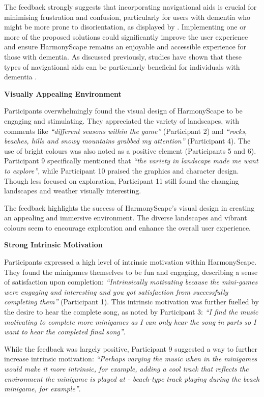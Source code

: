 \documentclass{l4proj}
\begin{document}
The feedback strongly suggests that incorporating navigational aids is crucial for minimising frustration and confusion, particularly for users with dementia who might be more prone to disorientation, as displayed by \cite{lin_effects_2002}. Implementing one or more of the proposed solutions could significantly improve the user experience and ensure HarmonyScape remains an enjoyable and accessible experience for those with dementia. As discussed previously, studies have shown that these types of navigational aids can be particularly beneficial for individuals with dementia \citep{boggio_non-invasive_2011}.
\newline

\textbf{Visually Appealing Environment}

Participants overwhelmingly found the visual design of HarmonyScape to be engaging and stimulating. They appreciated the variety of landscapes, with comments like \emph{“different seasons within the game”} (Participant 2) and \emph{“rocks, beaches, hills and snowy mountains grabbed my attention”} (Participant 4). The use of bright colours was also noted as a positive element (Participants 5 and 6).  Participant 9 specifically mentioned that \emph{“the variety in landscape made me want to explore”}, while Participant 10 praised the graphics and character design. Though less focused on exploration, Participant 11 still found the changing landscapes and weather visually interesting.

The feedback highlights the success of HarmonyScape's visual design in creating an appealing and immersive environment. The diverse landscapes and vibrant colours seem to encourage exploration and enhance the overall user experience.
\newline

\textbf{Strong Intrinsic Motivation}

Participants expressed a high level of intrinsic motivation within HarmonyScape. They found the minigames themselves to be fun and engaging, describing a sense of satisfaction upon completion: \emph{“Intrinsically motivating because the mini-games were engaging and interesting and you got satisfaction from successfully completing them”} (Participant 1). This intrinsic motivation was further fuelled by the desire to hear the complete song, as noted by Participant 3: \emph{“I find the music motivating to complete more minigames as I can only hear the song in parts so I want to hear the completed final song”}.

While the feedback was largely positive, Participant 9 suggested a way to further increase intrinsic motivation: \emph{“Perhaps varying the music when in the minigames would make it more intrinsic, for example, adding a cool track that reflects the environment the minigame is played at - beach-type track playing during the beach minigame, for example”}.
\end{document}
